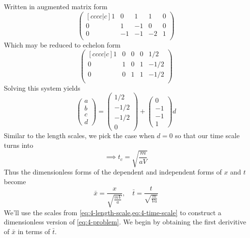 \documentclass[12pt,twoside]{article}
\begin{document}
Written in augmented matrix form
\begin{equation*}
  \begin{pmatrix}[cccc|c]
    1 & 0 & 1 & 1 & 0 \\
    0 & 1 & -1 & 0 & 0 \\
    0 & -1 & -1 & -2 & 1 \\
  \end{pmatrix}
\end{equation*}
Which may be reduced to echelon form
\begin{equation*}
  \begin{pmatrix}[cccc|c]
    1 & 0 & 0 & 0 & 1/2 \\
    0 & 1 & 0 & 1 & -1/2 \\
    0 & 0 & 1 & 1 & -1/2 \\
  \end{pmatrix}
\end{equation*}
Solving this system yields
\begin{equation*}
  \begin{pmatrix}
    a \\ b \\ c \\ d
  \end{pmatrix} =
  \begin{pmatrix}
    1/2 \\ -1/2 \\ -1/2 \\ 0
  \end{pmatrix} +
  \begin{pmatrix}
    0 \\ -1 \\ -1 \\ 1
  \end{pmatrix}
  d
\end{equation*}
Similar to the length scales, we pick the case when $d=0$ so that our time scale
turns into
\begin{equation}
  \label{eq:4-time-scale}
  \implies t_c = \sqrt{\frac{m}{aV}}
\end{equation}
Thus the dimensionless forms of the dependent and independent forms of $x$ and
$t$ become
\begin{equation*}
  \bar{x} = \frac{x}{\sqrt{\frac{mV}{a}}}, \quad
  \bar{t} = \frac{t}{\sqrt{\frac{m}{Va}}}
\end{equation*}
We'll use the scales from \cref{eq:4-length-scale,eq:4-time-scale} to construct
a dimensionless version of \cref{eq:4-problem}. We begin by obtaining the first
derivitive of $\bar{x}$ in terms of $\bar{t}$.
\end{document}
